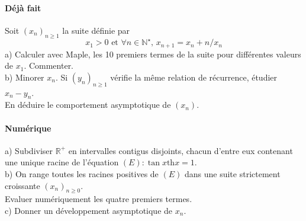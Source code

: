 \documentclass[a4paper,10pt]{article}
\begin{document}
\paragraph{Déjà fait}

Soit $(x_n )_{n \geqslant 1} $ la suite définie par
$$x_1  > 0\text{ et }\forall n \in \mathbb{N}^\star  \text{, }x_{n + 1}  = x_n
+ n / {x_n }$$
a) Calculer avec Maple, les 10 premiers termes de la suite pour différentes
valeurs de $x_1 $. Commenter.\\
b) Minorer $x_n $. Si $(y_n )_{n \geqslant 1} $ vérifie la même relation de
récurrence, étudier $x_n  - y_n $.\\
En déduire le comportement asymptotique de $(x_n )$.

\paragraph{Numérique}
a) Subdiviser $\mathbb{R}^ +  $ en intervalles contigus disjoints, chacun
d'entre eux contenant une unique racine de l'équation $(E):\tan x\textrm{th} x =
1$.\\
b) On range toutes les racines positives de $(E)$ dans une suite strictement
croissante $(x_n )_{n \geqslant 0} $.\\
Evaluer numériquement les quatre premiers termes.\\
c) Donner un développement asymptotique de $x_n $.
\end{document}
